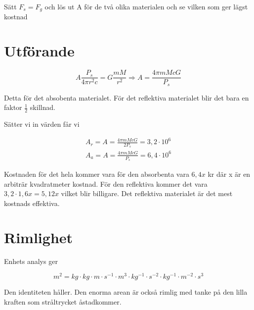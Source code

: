 \documentclass[a4paper]{article}
\begin{document}
Sätt $F_s = F_g$ och lös ut A för de två olika materialen och se vilken som ger lägst kostnad

\section{Utförande}

\begin{equation}
    A\frac{P_s}{4\pi r^2 c} = G \frac{mM}{r^2} \Rightarrow A = \frac{4\pi m M c G}{P_s}
\end{equation}

Detta för det absobenta materialet. För det reflektiva materialet blir det bara en faktor $\frac{1}{2}$ skillnad.

Sätter vi in värden får vi 

\begin{align}
    A_r =  A = \frac{4\pi m M c G}{2 P_s} = 3,2 \cdot 10^6\\
    A_a =  A = \frac{4\pi m M c G}{P_s} = 6,4 \cdot 10^6
\end{align}

Kostnaden för det hela kommer vara för den absorbenta vara $6,4x$ kr där x är en arbiträr kvadratmeter kostnad. För den reflektiva kommer det vara $3,2 \cdot 1,6x = 5,12x$ vilket blir billigare. Det reflektiva materialet är det mest kostnads effektiva. 

\section{Rimlighet}
Enhets analys ger

\begin{equation}
    m^2 = kg \cdot kg \cdot m \cdot s^{-1} \cdot m^3 \cdot kg^{-1} \cdot s^{-2} \cdot kg^{-1} \cdot m^{-2} \cdot s^3 
\end{equation}

Den identiteten håller. Den enorma arean är också rimlig med tanke på den lilla kraften som stråltrycket åstadkommer. 
\end{document}
